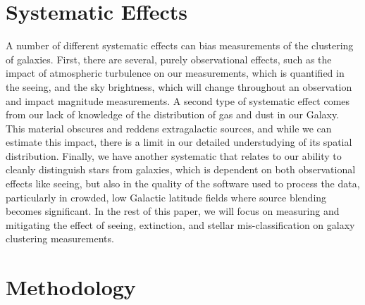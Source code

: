 \documentclass[11pt,twoside]{article}
\begin{document}
\section{Systematic Effects}
A number of different systematic effects can bias measurements of the clustering of galaxies. First, there are several, purely observational effects, such as the impact of atmospheric turbulence on our measurements, which is quantified in the seeing, and the sky brightness, which will change throughout an observation and impact magnitude measurements. A second type of systematic effect comes from our lack of knowledge of the distribution of gas and dust in our Galaxy. This material obscures and reddens extragalactic sources, and while we can estimate this impact, there is a limit in our detailed understudying of its spatial distribution. Finally, we have another systematic that relates to our ability to cleanly distinguish stars from galaxies, which is dependent on both observational effects like seeing, but also in the quality of the software used to process the data, particularly in crowded, low Galactic latitude fields where source blending becomes significant. In the rest of this paper, we will focus on measuring and mitigating the effect of seeing, extinction, and stellar mis-classification on galaxy clustering measurements.

%
%
%
%
\section{Methodology}
\end{document}
